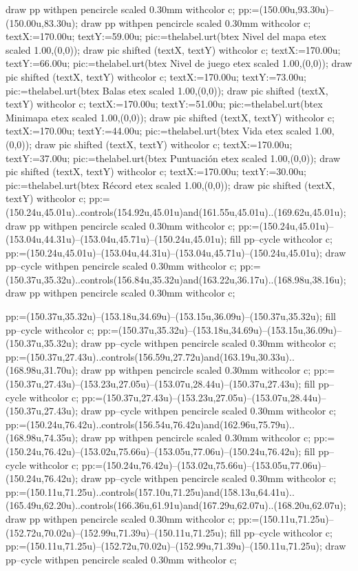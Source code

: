 draw pp withpen pencircle scaled 0.30mm withcolor c;
pp:=(150.00u,93.30u)--(150.00u,83.30u);
draw pp withpen pencircle scaled 0.30mm withcolor c;
textX:=170.00u; textY:=59.00u; pic:=thelabel.urt(btex {Nivel del mapa} etex scaled 1.00,(0,0)); draw pic shifted (textX, textY) withcolor c;
textX:=170.00u; textY:=66.00u; pic:=thelabel.urt(btex {Nivel de juego} etex scaled 1.00,(0,0)); draw pic shifted (textX, textY) withcolor c;
textX:=170.00u; textY:=73.00u; pic:=thelabel.urt(btex {Balas} etex scaled 1.00,(0,0)); draw pic shifted (textX, textY) withcolor c;
textX:=170.00u; textY:=51.00u; pic:=thelabel.urt(btex {Minimapa} etex scaled 1.00,(0,0)); draw pic shifted (textX, textY) withcolor c;
textX:=170.00u; textY:=44.00u; pic:=thelabel.urt(btex {Vida} etex scaled 1.00,(0,0)); draw pic shifted (textX, textY) withcolor c;
textX:=170.00u; textY:=37.00u; pic:=thelabel.urt(btex {Puntuación} etex scaled 1.00,(0,0)); draw pic shifted (textX, textY) withcolor c;
textX:=170.00u; textY:=30.00u; pic:=thelabel.urt(btex {Récord} etex scaled 1.00,(0,0)); draw pic shifted (textX, textY) withcolor c;
pp:=(150.24u,45.01u)..controls(154.92u,45.01u)and(161.55u,45.01u)..(169.62u,45.01u);
draw pp withpen pencircle scaled 0.30mm withcolor c;
pp:=(150.24u,45.01u)--(153.04u,44.31u)--(153.04u,45.71u)--(150.24u,45.01u);
fill pp--cycle withcolor c;
pp:=(150.24u,45.01u)--(153.04u,44.31u)--(153.04u,45.71u)--(150.24u,45.01u);
draw pp--cycle withpen pencircle scaled 0.30mm withcolor c;
pp:=(150.37u,35.32u)..controls(156.84u,35.32u)and(163.22u,36.17u)..(168.98u,38.16u);
draw pp withpen pencircle scaled 0.30mm withcolor c;

pp:=(150.37u,35.32u)--(153.18u,34.69u)--(153.15u,36.09u)--(150.37u,35.32u);
fill pp--cycle withcolor c;
pp:=(150.37u,35.32u)--(153.18u,34.69u)--(153.15u,36.09u)--(150.37u,35.32u);
draw pp--cycle withpen pencircle scaled 0.30mm withcolor c;
pp:=(150.37u,27.43u)..controls(156.59u,27.72u)and(163.19u,30.33u)..(168.98u,31.70u);
draw pp withpen pencircle scaled 0.30mm withcolor c;
pp:=(150.37u,27.43u)--(153.23u,27.05u)--(153.07u,28.44u)--(150.37u,27.43u);
fill pp--cycle withcolor c;
pp:=(150.37u,27.43u)--(153.23u,27.05u)--(153.07u,28.44u)--(150.37u,27.43u);
draw pp--cycle withpen pencircle scaled 0.30mm withcolor c;
pp:=(150.24u,76.42u)..controls(156.54u,76.42u)and(162.96u,75.79u)..(168.98u,74.35u);
draw pp withpen pencircle scaled 0.30mm withcolor c;
pp:=(150.24u,76.42u)--(153.02u,75.66u)--(153.05u,77.06u)--(150.24u,76.42u);
fill pp--cycle withcolor c;
pp:=(150.24u,76.42u)--(153.02u,75.66u)--(153.05u,77.06u)--(150.24u,76.42u);
draw pp--cycle withpen pencircle scaled 0.30mm withcolor c;
pp:=(150.11u,71.25u)..controls(157.10u,71.25u)and(158.13u,64.41u)..(165.49u,62.20u)..controls(166.36u,61.91u)and(167.29u,62.07u)..(168.20u,62.07u);
draw pp withpen pencircle scaled 0.30mm withcolor c;
pp:=(150.11u,71.25u)--(152.72u,70.02u)--(152.99u,71.39u)--(150.11u,71.25u);
fill pp--cycle withcolor c;
pp:=(150.11u,71.25u)--(152.72u,70.02u)--(152.99u,71.39u)--(150.11u,71.25u);
draw pp--cycle withpen pencircle scaled 0.30mm withcolor c;

